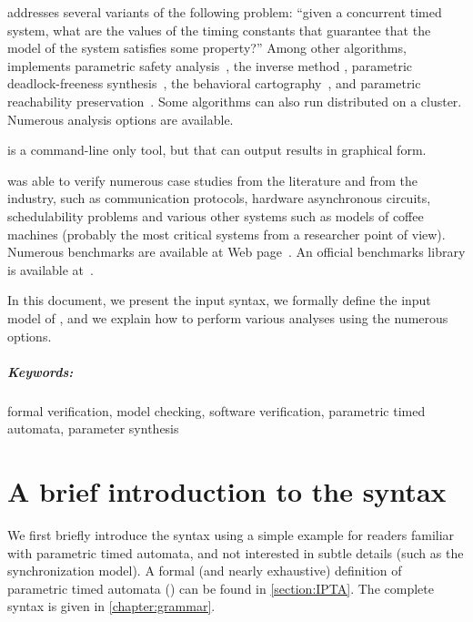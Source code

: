 \imitator{} addresses several variants of the following problem:
``given a concurrent timed system, what are the values of the timing constants that guarantee that the model of the system satisfies some property?''
Among other algorithms, \imitator{} implements
parametric safety analysis~\cite{AHV93,JLR15},
the inverse method \cite{ACEF09,AM15},
parametric deadlock-freeness synthesis~\cite{Andre16},
the behavioral cartography~\cite{AF10},
and
parametric reachability preservation~\cite{ALNS15}.
Some algorithms can also run distributed on a cluster.
Numerous analysis options are available.

\imitator{} is a command-line only tool, but that can output results in graphical form.

\imitator{} was able to verify numerous case studies from the literature and from the industry, such as communication protocols, hardware asynchronous circuits, schedulability problems and various other systems such as models of coffee machines (probably the most critical systems from a researcher point of view).
Numerous benchmarks are available at \imitator{} Web page~\cite{imitator}.
An official benchmarks library is available at~\cite{AMP21}.

In this document, we present the input syntax, we formally define the input model of \imitator{}, and we explain how to perform various analyses using the numerous options.


\paragraph{Keywords:} formal verification, model checking, software verification, parametric timed automata, parameter synthesis



\chapter{A brief introduction to the syntax}\label{chapter:syntax-introduction}

We first briefly introduce the syntax using a simple example for readers familiar with parametric timed automata, and not interested in subtle details (such as the synchronization model).
A formal (and nearly exhaustive) definition of \imitator{} parametric timed automata (\NIPTA{}) can be found in \cref{section:IPTA}.
The complete syntax is given in \cref{chapter:grammar}.

